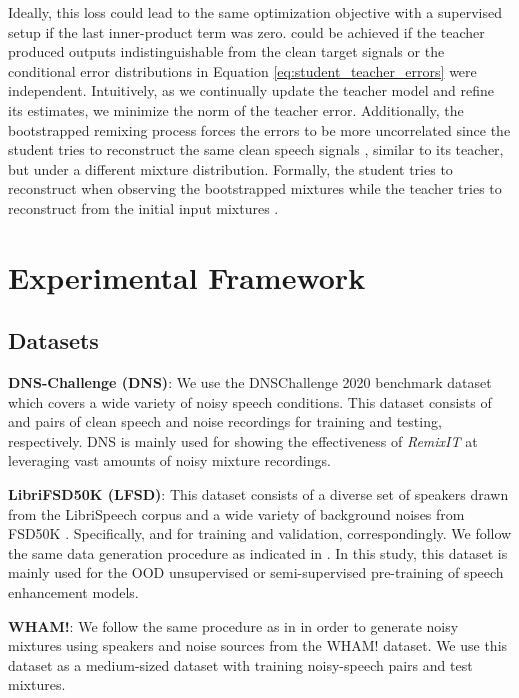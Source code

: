 \documentclass{article}
\begin{document}
Ideally, this loss could lead to the same optimization objective with a supervised setup if the last inner-product term was zero.  could be achieved if the teacher produced outputs indistinguishable from the clean target signals or the conditional error distributions in Equation \ref{eq:student_teacher_errors} were independent. Intuitively, as we continually update the teacher model and refine its estimates, we minimize the norm of the teacher error. Additionally, the bootstrapped remixing process forces the errors to be more uncorrelated since the student tries to reconstruct the same clean speech signals , similar to its teacher, but under a different mixture distribution. Formally, the student tries to reconstruct  when observing the bootstrapped mixtures  while the teacher tries to reconstruct  from the initial input mixtures . 





\section{Experimental Framework}
\label{sec:exp_fram}

\subsection{Datasets}
\label{sec:exp_fram:datasets}

\textbf{DNS-Challenge (DNS)}: We use the DNSChallenge 2020 benchmark dataset \cite{dnschallenge_2020} which covers a wide variety of noisy speech conditions. This dataset consists of  and  pairs of clean speech and noise recordings for training and testing, respectively. DNS is mainly used for showing the effectiveness of \textit{RemixIT} at leveraging vast amounts of noisy mixture recordings.

\noindent \textbf{LibriFSD50K (LFSD)}: This dataset consists of a diverse set of speakers drawn from the LibriSpeech \cite{librispeech} corpus and a wide variety of background noises from FSD50K \cite{fsd50k}. Specifically,  and  for training and validation, correspondingly. We follow the same data generation procedure as indicated in \cite{tzinis2021separate}. In this study, this dataset is mainly used for the OOD unsupervised or semi-supervised pre-training of speech enhancement models.

\noindent \textbf{WHAM!}: We follow the same procedure as in \cite{tzinis2021separate} in order to generate noisy mixtures using speakers and noise sources from the WHAM! \cite{WHAM} dataset. We use this dataset as a medium-sized dataset with  training noisy-speech pairs and  test mixtures. 
\end{document}
